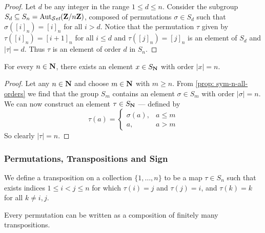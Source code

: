 \begin{proof}
  Let \(d\) be any integer in the range \(1 \leq d \leq n\). Consider the
  subgroup \(S_d \subseteq S_n = \operatorname{Aut}_{{\mathcal{S}\textit{et}}}(\mathbf{Z}/n\mathbf{Z})\), composed of permutations
  \(\sigma \in S_d\) such that \(\sigma([i]_n) = [i]_n\) for all \(i > d\).
  Notice that the permutation \(\tau\) given by \(\tau([i]_n) = [i + 1]_n\) for
  all \(i \leq d\) and \(\tau([j]_n) = [j]_n\) is an element of \(S_d\) and
  \(|\tau| = d\). Thus \(\tau\) is an element of order \(d\) in \(S_n\).
\end{proof}

\begin{corollary}
  For every \(n \in \mathbf{N}\), there exists an element \(x \in S_{\mathbf{N}}\) with
  order \(|x| = n\).
\end{corollary}

\begin{proof}
  Let any \(n \in \mathbf{N}\) and choose \(m \in \mathbf{N}\) with \(m \geq n\). From
  \cref{prop: sym-n-all-orders} we find that the group \(S_m\) contains
  an element \(\sigma \in S_m\) with order \(|\sigma| = n\). We can now
  construct an element \(\tau \in S_{\mathbf{N}}\) --- defined by
  \[
    \tau(a) =
    \begin{cases}
      \sigma(a), &a \leq m \\
      a, &a > m
    \end{cases}
  \]
  So clearly \(|\tau| = n\).
\end{proof}

\subsubsection{Permutations, Transpositions and Sign}

\begin{definition}[Transposition]
  \label{def: transposition}
  We define a transposition on a collection \(\{1, \dots, n\}\) to be a map
  \(\tau \in S_n\) such that exists indices \(1 \leq i < j \leq n\)
  for which \(\tau(i) = j\) and \(\tau(j) = i\), and \(\tau(k) = k\) for all
  \(k \neq i, j\).
\end{definition}

\begin{proposition}\label{prop: permutations to transpositions}
  Every permutation can be written as a composition of finitely many
  transpositions.
\end{proposition}

